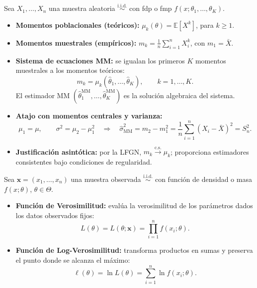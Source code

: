 \documentclass[10pt,a4paper]{article}
\newcommand{\E}{\mathbb{E}}
\newcommand{\iid}{\overset{\text{i.i.d.}}{\sim}}
\newcommand{\dcs}{\xrightarrow{\mathrm{c.s.}}}
\begin{document}
\begin{defbox}[frametitle={Método de los Momentos (MM)}]
Sea $X_1,\dots,X_n$ una muestra aleatoria $\iid$ con fdp o fmp $f(x;\theta_1,\dots,\theta_K)$.
\begin{itemize}
  \item \textbf{Momentos poblacionales (teóricos):} $\mu_k(\theta) = \E[X^k]$, para $k \ge 1$.
  \item \textbf{Momentos muestrales (empíricos):} $m_k = \frac{1}{n}\sum_{i=1}^n X_i^k$, con $m_1 = \bar X$.
  \item \textbf{Sistema de ecuaciones MM:} se igualan los primeros $K$ momentos muestrales a los momentos teóricos:
  \[
  m_k = \mu_k(\hat\theta_1,\dots,\hat\theta_K), \qquad k=1,\dots,K.
  \]
  El estimador MM $(\hat\theta_1^{\text{MM}},\dots,\hat\theta_K^{\text{MM}})$ es la solución algebraica del sistema.
  \item \textbf{Atajo con momentos centrales y varianza:}
  \[
  \mu_1 = \mu, \qquad \sigma^2 = \mu_2 - \mu_1^2 \quad\Longrightarrow\quad \hat\sigma^2_{\text{MM}} = m_2 - m_1^2 = \frac{1}{n}\sum_{i=1}^n (X_i - \bar X)^2 = S_n^2 .
  \]
  \item \textbf{Justificación asintótica:} por la LFGN, $m_k \dcs \mu_k$; proporciona estimadores consistentes bajo condiciones de regularidad.
\end{itemize}
\end{defbox}

\begin{defbox}[frametitle={Función de Verosimilitud y Log-Verosimilitud}]
Sea $\mathbf{x} = (x_1,\dots,x_n)$ una muestra observada $\iid$ con función de densidad o masa $f(x;\theta)$, $\theta\in\Theta$.
\begin{itemize}
  \item \textbf{Función de Verosimilitud:} evalúa la verosimilitud de los parámetros dados los datos observados fijos:
  \[
  L(\theta) = L(\theta;\mathbf{x}) = \prod_{i=1}^n f(x_i;\theta).
  \]
  \item \textbf{Función de Log-Verosimilitud:} transforma productos en sumas y preserva el punto donde se alcanza el máximo:
  \[
  \ell(\theta) = \ln L(\theta) = \sum_{i=1}^n \ln f(x_i;\theta).
  \]
\end{itemize}
\end{defbox}
\end{document}
